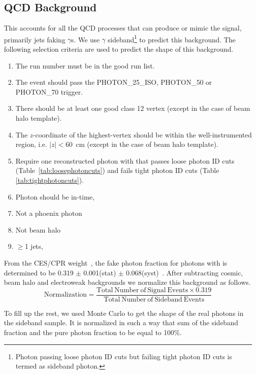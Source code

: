 \documentclass[11pt]{article}
\begin{document}
\subsection{QCD Background}
This accounts for all the QCD processes that can produce or mimic the \phojets signal, primarily jets faking $\gamma$s. We use $\gamma$ sideband\footnote{Photon passing loose photon ID cuts but failing tight photon ID cuts is termed as sideband photon.} to predict this background. The following selection criteria are used to predict the shape of this background.

\begin{enumerate}
	\item The run number must be in the good run list.
	\item The event should pass the PHOTON\_25\_ISO, PHOTON\_50 or \mbox{PHOTON\_70} trigger. 
	\item There should be at least one good class 12 vertex (except in the case of beam halo template).
	\item The $z$-coordinate of the highest-\pt vertex should be within the well-instrumented region, i.e. \mbox{$|z|<60$~cm} (except in the case of beam halo template).
	\item Require one reconstructed photon with  that passes loose photon ID cuts \mbox{(Table~\ref{tab:loosephotoncuts})} and fails tight photon ID cuts (Table \ref{tab:tightphotoncuts}). 
	\item Photon should be in-time, \intimewindow
	\item Not a phoenix photon
	\item Not beam halo
	\item $\geq$1 jets, 
\end{enumerate}

\noindent From the CES/CPR weight~\cite{wwwCESCPR}, the fake photon fraction for photons with  is determined to be 0.319 $\pm$ 0.001(stat) $\pm$ 0.068(syst)~\cite{wwwCESCPR}. After subtracting cosmic, beam halo and electroweak backgrounds we normalize this background as follows.
\begin{equation}
\mathrm{Normalization = \frac{Total~Number~of~Signal~Events \times 0.319}{Total~Number~of~Sideband~Events}}
\end{equation}

\noindent To fill up the rest, we used \pho Monte Carlo to get the shape of the real photons in the sideband sample. It is normalized in such a way that sum of the sideband fraction and the pure photon fraction to be equal to 100\%.
\end{document}
